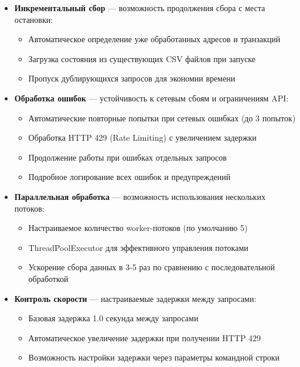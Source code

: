 \begin{itemize}
    \item \textbf{Инкрементальный сбор} --- возможность продолжения сбора с места остановки:
    \begin{itemize}
        \item Автоматическое определение уже обработанных адресов и транзакций
        \item Загрузка состояния из существующих CSV файлов при запуске
        \item Пропуск дублирующихся запросов для экономии времени
    \end{itemize}
    
    \item \textbf{Обработка ошибок} --- устойчивость к сетевым сбоям и ограничениям API:
    \begin{itemize}
        \item Автоматические повторные попытки при сетевых ошибках (до 3 попыток)
        \item Обработка HTTP 429 (Rate Limiting) с увеличением задержки
        \item Продолжение работы при ошибках отдельных запросов
        \item Подробное логирование всех ошибок и предупреждений
    \end{itemize}
    
    \item \textbf{Параллельная обработка} --- возможность использования нескольких потоков:
    \begin{itemize}
        \item Настраиваемое количество worker-потоков (по умолчанию 5)
        \item ThreadPoolExecutor для эффективного управления потоками
        \item Ускорение сбора данных в 3-5 раз по сравнению с последовательной обработкой
    \end{itemize}
    
    \item \textbf{Контроль скорости} --- настраиваемые задержки между запросами:
    \begin{itemize}
        \item Базовая задержка 1.0 секунда между запросами
        \item Автоматическое увеличение задержки при получении HTTP 429
        \item Возможность настройки задержки через параметры командной строки
    \end{itemize}
    

\end{itemize}
